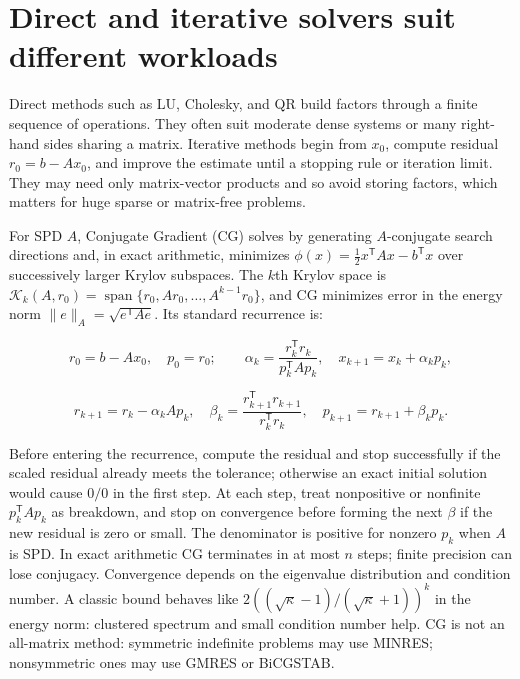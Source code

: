\section{Direct and iterative solvers suit different workloads}\label{02-foundations-ii-ch038-direct-and-iterative-solvers-suit-different-workloads}

\hypertarget{02-foundations-ii-ch038-direct-and-iterative-solvers-suit-different-workloads}{}

Direct methods such as LU, Cholesky, and QR build factors through a finite sequence of operations. They often suit moderate dense systems or many right-hand sides sharing a matrix. Iterative methods begin from \(x_0\), compute residual \(r_0=b-Ax_0\), and improve the estimate until a stopping rule or iteration limit. They may need only matrix-vector products and so avoid storing factors, which matters for huge sparse or matrix-free problems.

For SPD \(A\), Conjugate Gradient (CG) solves by generating \(A\)-conjugate search directions and, in exact arithmetic, minimizes \(\phi(x)=\tfrac12x^\mathsf TAx-b^\mathsf Tx\) over successively larger Krylov subspaces. The \(k\)th Krylov space is \(\mathcal K_k(A,r_0)=\operatorname{span}\{r_0,Ar_0,\ldots,A^{k-1}r_0\}\), and CG minimizes error in the energy norm \(\|e\|_A=\sqrt{e^\mathsf TAe}\). Its standard recurrence is:

\[
r_0=b-Ax_0,\quad p_0=r_0;
\qquad \alpha_k=\frac{r_k^\mathsf Tr_k}{p_k^\mathsf TAp_k},\quad
x_{k+1}=x_k+\alpha_kp_k,
\]

\[
r_{k+1}=r_k-\alpha_kAp_k,\quad
\beta_k=\frac{r_{k+1}^\mathsf Tr_{k+1}}{r_k^\mathsf Tr_k},\quad
p_{k+1}=r_{k+1}+\beta_kp_k.
\]

Before entering the recurrence, compute the residual and stop successfully if the scaled residual already meets the tolerance; otherwise an exact initial solution would cause \(0/0\) in the first step. At each step, treat nonpositive or nonfinite \(p_k^\mathsf TAp_k\) as breakdown, and stop on convergence before forming the next \(\beta\) if the new residual is zero or small. The denominator is positive for nonzero \(p_k\) when \(A\) is SPD. In exact arithmetic CG terminates in at most \(n\) steps; finite precision can lose conjugacy. Convergence depends on the eigenvalue distribution and condition number. A classic bound behaves like \(2((\sqrt\kappa-1)/(\sqrt\kappa+1))^k\) in the energy norm: clustered spectrum and small condition number help. CG is not an all-matrix method: symmetric indefinite problems may use MINRES; nonsymmetric ones may use GMRES or BiCGSTAB.

